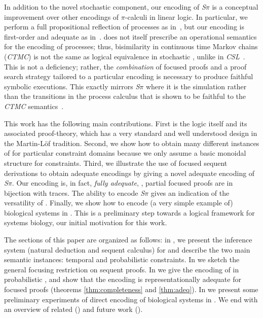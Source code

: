 \documentclass{article}
\newcommand\proofsystem[1]{{\smaller\rmfamily\slshape #1}\xspace}
\newcommand\Spi{\proofsystem{S$\pi$}}
\newcommand\CTMC{\proofsystem{CTMC}}
\begin{document}
In addition to the novel stochastic component, our encoding of \Spi is a
conceptual improvement over other encodings of $\pi$-calculi in linear logic.
In particular, we perform a full propositional reflection of processes as
in~\cite{miller92welp}, but our encoding is first-order and adequate as
in~\cite{cervesato03tr}.
\hyll does not itself prescribe an operational semantics for the encoding of
processes; thus, bisimilarity in continuous time Markov chains (\CTMC) is not
the same as logical equivalence in stochastic \hyll, unlike in
\proofsystem{CSL}~\cite{desharmais03jlap}.
This is not a deficiency; rather, the \emph{combination} of focused \hyll proofs
and a proof search strategy tailored to a particular encoding is necessary to
produce faithful symbolic executions.
This exactly mirrors \Spi where it is the simulation rather than the transitions
in the process calculus that is shown to be faithful to the \CTMC
semantics~\cite{phillips04cmmb}.

This work has the following main contributions.
First is the logic \hyll itself and its associated proof-theory, which has a
very standard and well understood design in the Martin-Löf tradition.
Second, we show how to obtain many different instances of \hyll for particular
constraint domains because we only assume a basic monoidal structure for
constraints.
Third, we illustrate the use of focused sequent derivations to obtain adequate
encodings by giving a novel adequate encoding of \Spi.
Our encoding is, in fact, \emph{fully adequate}, \ie, partial focused proofs are
in bijection with traces.
The ability to encode \Spi gives an indication of the versatility of \hyll.
Finally, we show how to encode (a very simple example of) biological systems in \hyll.
This is a preliminary step
towards a logical framework for systems biology, our initial motivation for this work.

The sections of this paper are organized as follows: in , we
present the inference system (natural deduction and sequent calculus) for \hyll
and describe the two main semantic instances: temporal and probabilistic constraints.  
In  we sketch the general focusing restriction on \hyll sequent
proofs. 
In  we give the encoding of \spi in probabilistic \hyll, and show that
the encoding is representationally adequate for focused proofs
(theorems \ref{thm:completeness} and \ref{thm:adeq}).  
In  we present some preliminary experiments of direct encoding of 
biological systems in \hyll.
We end with an overview of related () and future work 
().
\end{document}
